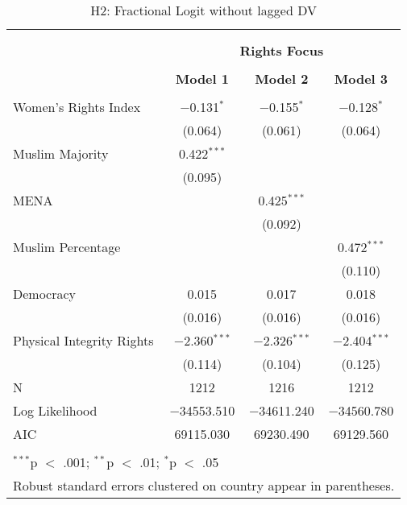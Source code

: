 
\begin{table}[!htbp] \centering 
  \caption{H2: Fractional Logit without lagged DV} 
  \label{} 
\begin{tabular}{@{\extracolsep{5pt}}lccc} 
\\[-1.8ex]\hline \\[-1.8ex] 
\\[-1.8ex] & \multicolumn{3}{c}{\textbf{Rights Focus}} \\ 
\\[-1.8ex] & \textbf{Model 1} & \textbf{Model 2} & \textbf{Model 3}\\ 
\hline \\[-1.8ex] 
 Women's Rights Index & $-$0.131$^{*}$ & $-$0.155$^{*}$ & $-$0.128$^{*}$ \\ 
  & (0.064) & (0.061) & (0.064) \\ 
  Muslim Majority & 0.422$^{***}$ &  &  \\ 
  & (0.095) &  &  \\ 
  MENA &  & 0.425$^{***}$ &  \\ 
  &  & (0.092) &  \\ 
  Muslim Percentage &  &  & 0.472$^{***}$ \\ 
  &  &  & (0.110) \\ 
  Democracy & 0.015 & 0.017 & 0.018 \\ 
  & (0.016) & (0.016) & (0.016) \\ 
  Physical Integrity Rights & $-$2.360$^{***}$ & $-$2.326$^{***}$ & $-$2.404$^{***}$ \\ 
  & (0.114) & (0.104) & (0.125) \\ 
 N & 1212 & 1216 & 1212 \\ 
Log Likelihood & $-$34553.510 & $-$34611.240 & $-$34560.780 \\ 
AIC & 69115.030 & 69230.490 & 69129.560 \\ 
\hline \\[-1.8ex] 
\multicolumn{4}{l}{$^{***}$p $<$ .001; $^{**}$p $<$ .01; $^{*}$p $<$ .05} \\ 
\multicolumn{4}{l}{Robust standard errors clustered on country appear in parentheses.} \\ 
\end{tabular} 
\end{table} 
